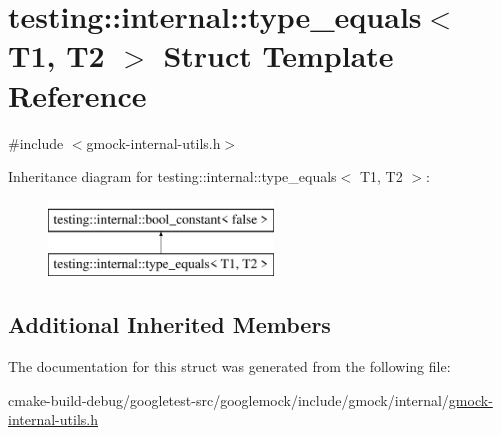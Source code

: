 \hypertarget{structtesting_1_1internal_1_1type__equals}{}\section{testing\+::internal\+::type\+\_\+equals$<$ T1, T2 $>$ Struct Template Reference}
\label{structtesting_1_1internal_1_1type__equals}


{\ttfamily \#include $<$gmock-\/internal-\/utils.\+h$>$}

Inheritance diagram for testing\+::internal\+::type\+\_\+equals$<$ T1, T2 $>$\+:\begin{figure}[H]
\begin{center}
\leavevmode
\includegraphics[height=2.000000cm]{structtesting_1_1internal_1_1type__equals}
\end{center}
\end{figure}
\subsection*{Additional Inherited Members}


The documentation for this struct was generated from the following file\+:\begin{DoxyCompactItemize}
\item 
cmake-\/build-\/debug/googletest-\/src/googlemock/include/gmock/internal/\mbox{\hyperlink{gmock-internal-utils_8h}{gmock-\/internal-\/utils.\+h}}\end{DoxyCompactItemize}
